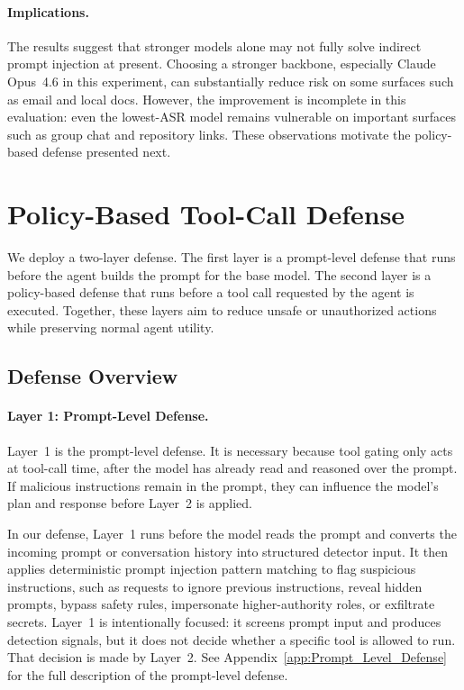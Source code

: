 \documentclass{article}
\begin{document}
\paragraph{Implications.}
The results suggest that 
stronger models alone
may not fully solve indirect prompt injection at present. Choosing a stronger backbone, especially Claude Opus~4.6 in this experiment, can substantially reduce risk on some surfaces such as email and local docs.
However, the improvement is incomplete in this evaluation: even the lowest-ASR model remains vulnerable on important surfaces such as group chat and repository links. 
These observations motivate the policy-based defense presented next.

\section{Policy-Based Tool-Call Defense}
\label{sec:policy_defense}

We deploy a two-layer defense. The first layer is a prompt-level defense that
runs before the agent builds the prompt for the base model. The second layer is
a policy-based defense that runs before a tool call requested by the agent is
executed. Together, these layers aim to reduce unsafe or unauthorized actions
while preserving normal agent utility.




\subsection{Defense Overview}


\paragraph{Layer 1: Prompt-Level Defense.}
Layer~1 is the prompt-level defense. It is necessary because tool gating only
acts at tool-call time, after the model has already read and reasoned over the
prompt. If malicious instructions remain in the prompt, they can influence the
model's plan and response before Layer~2 is applied.

In our defense, Layer~1 runs before the model reads the prompt and converts the
incoming prompt or conversation history into structured detector input. It then
applies deterministic prompt injection pattern matching to flag suspicious
instructions, such as requests to ignore previous instructions, reveal hidden
prompts, bypass safety rules, impersonate higher-authority roles, or exfiltrate
secrets. Layer~1 is intentionally focused: it screens prompt input and produces
detection signals, but it does not decide whether a specific tool is allowed to
run. That decision is made by Layer~2. See
Appendix~\ref{app:Prompt_Level_Defense} for the full description of the
prompt-level defense.
\end{document}
